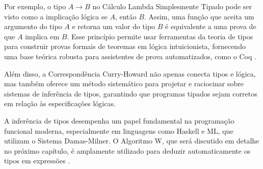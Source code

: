 Por exemplo, o tipo $A \to B$ no Cálculo Lambda Simplesmente Tipado pode ser visto como a implicação lógica se $A$, então $B$.
Assim, uma função que aceita um argumento do tipo $A$ e retorna um valor do tipo $B$ é equivalente a uma prova de que $A$ implica em $B$.
Esse princípio permite usar ferramentas da teoria de tipos para construir provas formais de teoremas em lógica intuicionista, fornecendo uma base teórica robusta para assistentes de prova automatizados, como o Coq \cite{COQUAND1998}.

Além disso, a Correspondência Curry-Howard não apenas conecta tipos e lógica, mas também oferece um método sistemático para projetar e raciocinar sobre sistemas de inferência de tipos, garantindo que programas tipados sejam corretos em relação às especificações lógicas.

A inferência de tipos desempenha um papel fundamental na programação funcional moderna, especialmente em linguagens como Haskell e ML, que utilizam o Sistema Damas-Milner.
O Algoritmo W, que será discutido em detalhe no próximo capítulo, é amplamente utilizado para deduzir automaticamente os tipos em expressões \cite{PIERCE2002}.
